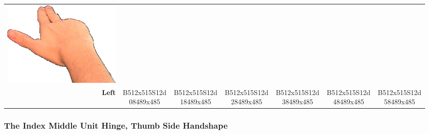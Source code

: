 \documentclass{article}
\begin{document}
\begin{center}
\begin{tabular}{r*{6}{c}}
\includegraphics[scale=0.1]{images/03-07-6.jpg}\\
\textbf{Left}&
B512x515S12d08489x485&
B512x515S12d18489x485&
B512x515S12d28489x485&
B512x515S12d38489x485&
B512x515S12d48489x485&
B512x515S12d58489x485\\
\end{tabular}
\end{center}

\subsubsection{The Index Middle Unit Hinge, Thumb Side Handshape}
\end{document}
